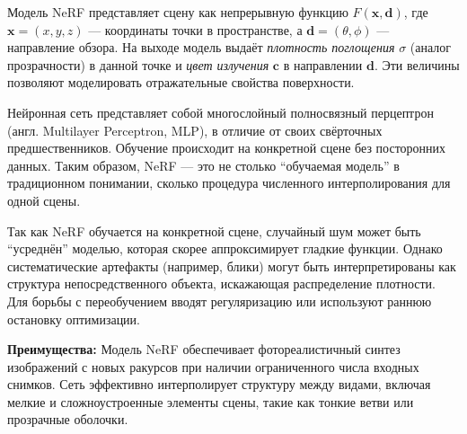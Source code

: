 Модель NeRF представляет сцену как непрерывную функцию $F(\mathbf{x},
\mathbf{d})$, где $\mathbf{x} = (x, y, z)$ — координаты точки в пространстве, а
$\mathbf{d}=(\theta,\phi)$ — направление обзора. На выходе модель выдаёт
\textit{плотность поглощения} $\sigma$ (аналог прозрачности) в данной точке и
\textit{цвет излучения} $\mathbf{c}$ в направлении $\mathbf{d}$. Эти величины
позволяют моделировать отражательные свойства поверхности.

Нейронная сеть представляет собой  многослойный полносвязный перцептрон (англ.
Multilayer Perceptron, MLP), в отличие от своих свёрточных предшественников.
Обучение происходит на конкретной сцене без посторонних данных. Таким образом,
NeRF — это не столько ``обучаемая модель'' в традиционном понимании, сколько
процедура численного интерполирования для одной сцены.

Так как NeRF обучается на конкретной сцене, случайный шум может быть ``усреднён''
моделью, которая скорее аппроксимирует гладкие функции. Однако систематические
артефакты (например, блики) могут быть интерпретированы как структура
непосредственного объекта, искажающая распределение плотности. Для борьбы с
переобучением вводят регуляризацию или используют раннюю остановку оптимизации.

\textbf{Преимущества:}
Модель NeRF обеспечивает фотореалистичный синтез изображений с новых ракурсов
при наличии ограниченного числа входных снимков. Сеть эффективно интерполирует
структуру между видами, включая мелкие и сложноустроенные элементы сцены, такие
как тонкие ветви или прозрачные оболочки.

